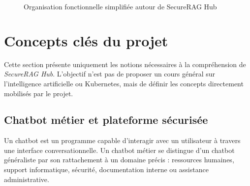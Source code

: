 \begin{figure}[htbp]
    \centering
    \caption{Organisation fonctionnelle simplifiée autour de SecureRAG Hub}
    \label{fig:organigramme_fonctionnel_securerag}
\end{figure}

\section{Concepts clés du projet}

Cette section présente uniquement les notions nécessaires à la compréhension de \textit{SecureRAG Hub}. L'objectif n'est pas de proposer un cours général sur l'intelligence artificielle ou Kubernetes, mais de définir les concepts directement mobilisés par le projet.

\subsection{Chatbot métier et plateforme sécurisée}

Un chatbot est un programme capable d'interagir avec un utilisateur à travers une interface conversationnelle. Un chatbot métier se distingue d'un chatbot généraliste par son rattachement à un domaine précis : ressources humaines, support informatique, sécurité, documentation interne ou assistance administrative.

